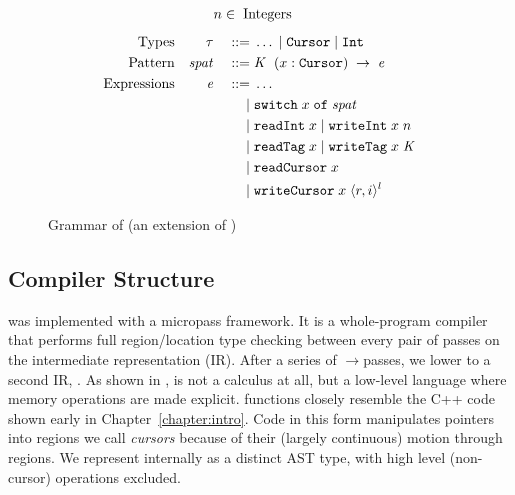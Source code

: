 \begin{figure}
  \begin{displaymath}
    \begin{aligned}
      &n \in \; \textup{Integers}
    \end{aligned}
  \end{displaymath}
  \begin{displaymath}
    \begin{aligned}
      \textup{Types} && \mathit{\tau} && \; ::= \; & \ldots \; | \; \texttt{Cursor} \; | \; \texttt{Int} \\
      \textup{Pattern} && \mathit{spat} && \; ::= \; & \mathit{K} \; \;(x : \texttt{Cursor}) \;\rightarrow \;\mathit{e} \\
      \textup{Expressions} && \mathit{e} && \; ::= \; & \dots \\
      && && \; | \; & \texttt{switch}\; x \;\texttt{of}\;\mathit{spat}\\
      && && \; | \; & \texttt{\text{readInt}} \; x \; | \; \texttt{\text{writeInt}} \; x \; n \\
      && && \; | \; & \texttt{\text{readTag}} \; x \; | \; \texttt{\text{writeTag}} \; x \; \mathit{K} \\
      && && \; | \; & \texttt{\text{readCursor}} \; x \\
      && && \; | \; & \texttt{\text{writeCursor}} \; x \; \langle r, i \rangle ^{l} \\
    \end{aligned}
  \end{displaymath}
  \normalsize
  \caption{{Grammar of \lamcur{} (an extension of \ourcalc{}) \captionscrunch}}
  \label{fig:nocal-grammar}
\end{figure}

\subsection{Compiler Structure}\label{subsec:compiler_structure}
\ourcalc was implemented with a micropass framework. It is a whole-program
compiler that performs full region/location type checking
between every pair of passes on the \ourcalc intermediate representation (IR).
%
%
After a series of \ourcalc$\rightarrow$\ourcalc passes, we lower to a second IR,
\emph{\lamcur}.
As shown in ,
\lamcur is not a calculus at all, but a low-level language where
memory operations are made explicit.  \lamcur{} functions closely resemble the C++
code shown early in Chapter~\ref{chapter:intro}.
%
Code in this form manipulates pointers into regions we call {\em cursors} because of
their (largely continuous) motion through regions.
%
{We represent \lamcur internally as a
  distinct AST type, with high level (non-cursor) operations excluded.}

